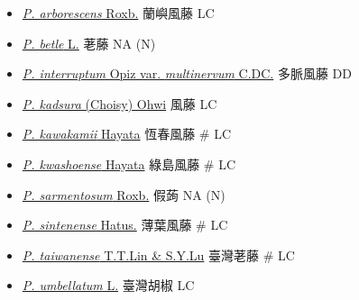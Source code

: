 \begin{itemize}
  \begin{itemize}
        \item[] \href{http://www.theplantlist.org/tpl1.1/search?q=Piper+arborescens}{\textit{P. arborescens} Roxb.}   蘭嶼風藤   LC
        \item[] \href{http://www.theplantlist.org/tpl1.1/search?q=Piper+betle}{\textit{P. betle} L.}   荖藤   NA (N)
        \item[] \href{http://www.theplantlist.org/tpl1.1/search?q=Piper+interruptum+var.+multinervum}{\textit{P. interruptum} Opiz var. \textit{multinervum} C.DC.}   多脈風藤   DD
        \item[] \href{http://www.theplantlist.org/tpl1.1/search?q=Piper+kadsura}{\textit{P. kadsura} (Choisy) Ohwi}   風藤   LC
        \item[] \href{http://www.theplantlist.org/tpl1.1/search?q=Piper+kawakamii}{\textit{P. kawakamii} Hayata}   恆春風藤  \# LC
        \item[] \href{http://www.theplantlist.org/tpl1.1/search?q=Piper+kwashoense}{\textit{P. kwashoense} Hayata}   綠島風藤  \# LC
        \item[] \href{http://www.theplantlist.org/tpl1.1/search?q=Piper+sarmentosum}{\textit{P. sarmentosum} Roxb.}   假蒟   NA (N)
        \item[] \href{http://www.theplantlist.org/tpl1.1/search?q=Piper+sintenense}{\textit{P. sintenense} Hatus.}   薄葉風藤  \# LC
        \item[] \href{http://www.theplantlist.org/tpl1.1/search?q=Piper+taiwanense}{\textit{P. taiwanense} T.T.Lin \& S.Y.Lu}   臺灣荖藤  \# LC
        \item[] \href{http://www.theplantlist.org/tpl1.1/search?q=Piper+umbellatum}{\textit{P. umbellatum} L.}   臺灣胡椒   LC
  \end{itemize}
  \end{itemize}
